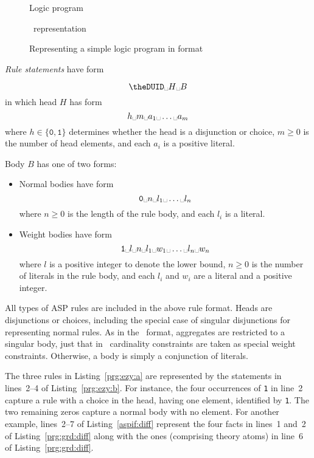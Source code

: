 \begin{figure}
\captionsetup{type=lstlisting}
{\begin{sublstlisting}[b]{0.4\linewidth}
%
\caption{Logic program}
\label{prg:ezy:a}
\end{sublstlisting}}%
\hfill%
{\begin{sublstlisting}[b]{0.4\linewidth}
%
\caption{\aspif\ representation}
\label{prg:ezy:b}
\end{sublstlisting}}%
\caption{Representing a simple logic program in \aspif{} format}
\label{prg:ezy}
\end{figure}
%
%
\newcommand{\myparagraph}[1]{\par\emph{#1}}
\myparagraph{Rule statements} have form
\addtocounter{DUID}{1}
\[\texttt{\theDUID} \Space H \Space B\]
in which head $H$ has form
\[h \Space m \Space a_1 \Space \dots \Space a_m\]
where
$h \in \{\texttt{0},\texttt{1}\}$ determines whether the head is a disjunction or choice,
$m \geq 0$ is the number of head elements, and
each $a_i$ is a positive literal.

Body $B$ has one of two forms:
\begin{itemize}
\item Normal bodies have form
  \[\texttt{0} \Space n \Space l_{1} \Space \dots \Space l_n\]
  where
  $n \geq 0$ is the length of the rule body, and
  each $l_i$ is a literal.
\item Weight bodies have form
  \[\texttt{1} \Space l \Space n \Space l_1 \Space w_1  \Space \dots \Space l_n \Space w_n\]
  where
  $l$ is a positive integer to denote the lower bound,
  $n \geq 0$ is the number of literals in the rule body, and
  each $l_i$ and $w_i$ are a literal and a positive integer.
\end{itemize}
All types of ASP rules are included in the above rule format.
Heads are disjunctions or choices, including the special case of singular disjunctions for representing normal rules.
As in the \smodels\ format,
aggregates are restricted to a singular body, just that in \aspif\ cardinality constraints are taken as special weight constraints.
Otherwise, a body is simply a conjunction of literals.

The three rules in Listing~\ref{prg:ezy:a} are represented by the statements in lines~2--4 of Listing~\ref{prg:ezy:b}.
For instance, the four occurrences of \lstinline{1} in line~2 capture a rule with a choice in the head, having one element, identified by \lstinline{1}.
The two remaining zeros capture a normal body with no element.
For another example,
lines~2--7 of Listing~\ref{aspif:diff} represent the four facts in lines~1 and~2 of Listing~\ref{prg:grd:diff}
along with the ones (comprising theory atoms) in line~6 of Listing~\ref{prg:grd:diff}.

